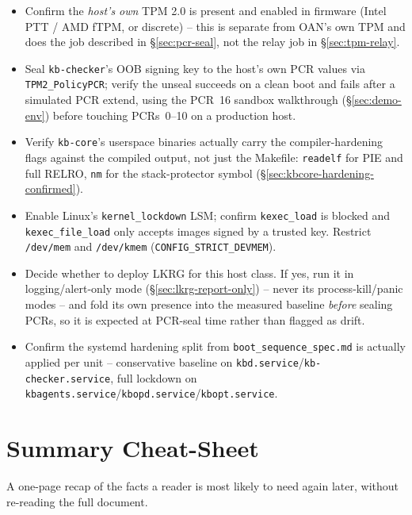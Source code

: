 \documentclass[11pt,a4paper]{article}
\begin{document}
\begin{itemize}[label=$\square$]
  \item Confirm the \emph{host's own} TPM 2.0 is present and enabled in
    firmware (Intel PTT / AMD fTPM, or discrete) -- this is separate
    from OAN's own TPM and does the job described in
    \S\ref{sec:pcr-seal}, not the relay job in \S\ref{sec:tpm-relay}.
  \item Seal \texttt{kb-checker}'s OOB signing key to the host's own
    PCR values via \texttt{TPM2\_PolicyPCR}; verify the unseal succeeds
    on a clean boot and fails after a simulated PCR extend, using the
    PCR~16 sandbox walkthrough (\S\ref{sec:demo-env}) before touching
    PCRs~0--10 on a production host.
  \item Verify \texttt{kb-core}'s userspace binaries actually carry the
    compiler-hardening flags against the compiled output, not just the
    Makefile: \texttt{readelf} for PIE and full RELRO, \texttt{nm} for
    the stack-protector symbol (\S\ref{sec:kbcore-hardening-confirmed}).
  \item Enable Linux's \texttt{kernel\_lockdown} LSM; confirm
    \texttt{kexec\_load} is blocked and \texttt{kexec\_file\_load}
    only accepts images signed by a trusted key. Restrict
    \texttt{/dev/mem} and \texttt{/dev/kmem}
    (\texttt{CONFIG\_STRICT\_DEVMEM}).
  \item Decide whether to deploy LKRG for this host class. If yes, run
    it in logging/alert-only mode (\S\ref{sec:lkrg-report-only}) --
    never its process-kill/panic modes -- and fold its own presence
    into the measured baseline \emph{before} sealing PCRs, so it is
    expected at PCR-seal time rather than flagged as drift.
  \item Confirm the systemd hardening split from
    \texttt{boot\_sequence\_spec.md} is actually applied per unit --
    conservative baseline on \texttt{kbd.service}/\texttt{kb-checker.service},
    full lockdown on \texttt{kbagents.service}/\texttt{kbopd.service}/\texttt{kbopt.service}.
\end{itemize}

\section{Summary Cheat-Sheet}
\label{sec:cheatsheet}

A one-page recap of the facts a reader is most likely to need again
later, without re-reading the full document.
\end{document}

